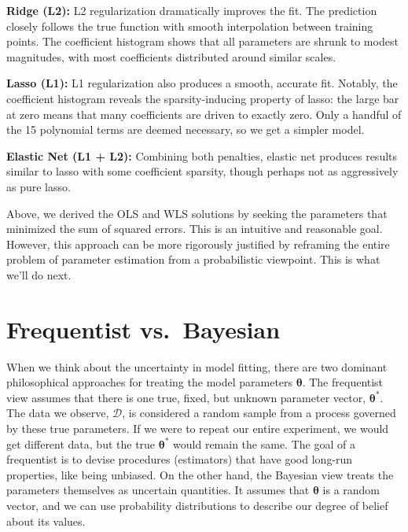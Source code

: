 \begin{exampleBox}
    \textbf{Ridge (L2):} L2 regularization dramatically improves the fit. The prediction closely follows the true function with smooth interpolation between training points. The coefficient histogram shows that all parameters are shrunk to modest magnitudes, with most coefficients distributed around similar scales.
    
    \textbf{Lasso (L1):} L1 regularization also produces a smooth, accurate fit. Notably, the coefficient histogram reveals the sparsity-inducing property of lasso: the large bar at zero means that many coefficients are driven to exactly zero. Only a handful of the 15 polynomial terms are deemed necessary, so we get a simpler model.
    
    \textbf{Elastic Net (L1 + L2):} Combining both penalties, elastic net produces results similar to lasso with some coefficient sparsity, though perhaps not as aggressively as pure lasso. 

\end{exampleBox}

Above, we derived the OLS and WLS solutions by seeking the parameters that minimized the sum of squared errors. This is an intuitive and reasonable goal. However, this approach can be more rigorously justified by reframing the entire problem of parameter estimation from a probabilistic viewpoint. This is what we'll do next.

\section{Frequentist vs.\ Bayesian}
When we think about the uncertainty in model fitting, there are two dominant philosophical approaches for treating the model parameters $\boldsymbol{\theta}$. The frequentist view assumes that there is one true, fixed, but unknown parameter vector, $\boldsymbol{\theta}^*$. The data we observe, $\mathcal{D}$, is considered a random sample from a process governed by these true parameters. If we were to repeat our entire experiment, we would get different data, but the true $\boldsymbol{\theta}^*$ would remain the same. The goal of a frequentist is to devise procedures (estimators) that have good long-run properties, like being unbiased. On the other hand, the Bayesian view treats the parameters themselves as uncertain quantities. It assumes that $\boldsymbol{\theta}$ is a random vector, and we can use probability distributions to describe our degree of belief about its values.


